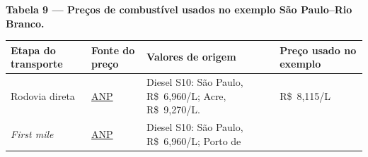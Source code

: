 \documentclass[brazil,]{article}
\newcommand{\keeptable}{\Needspace{0.64\textheight}}
\begin{document}
\keeptable
\textbf{Tabela 9 --- Preços de combustível usados no exemplo São
Paulo--Rio Branco.}

\begin{longtable}[]{@{}llll@{}}
\toprule
\begin{minipage}[b]{0.22\columnwidth}\raggedright
Etapa do transporte\strut
\end{minipage} & \begin{minipage}[b]{0.22\columnwidth}\raggedright
Fonte do preço\strut
\end{minipage} & \begin{minipage}[b]{0.22\columnwidth}\raggedright
Valores de origem\strut
\end{minipage} & \begin{minipage}[b]{0.22\columnwidth}\raggedright
Preço usado no exemplo\strut
\end{minipage}\tabularnewline
\midrule
\endhead
\begin{minipage}[t]{0.22\columnwidth}\raggedright
Rodovia direta\strut
\end{minipage} & \begin{minipage}[t]{0.22\columnwidth}\raggedright
\href{https://www.gov.br/anp/pt-br/assuntos/precos-e-defesa-da-concorrencia/precos/levantamento-de-precos-de-combustiveis-ultimas-semanas-pesquisadas}{ANP}\strut
\end{minipage} & \begin{minipage}[t]{0.22\columnwidth}\raggedright
Diesel S10: \newline{} São Paulo, R\$~6,960/L; \newline{} Acre,
R\$~9,270/L.\strut
\end{minipage} & \begin{minipage}[t]{0.22\columnwidth}\raggedright
R\$~8,115/L\strut
\end{minipage}\tabularnewline
\begin{minipage}[t]{0.22\columnwidth}\raggedright
\emph{First mile}\strut
\end{minipage} & \begin{minipage}[t]{0.22\columnwidth}\raggedright
\href{https://www.gov.br/anp/pt-br/assuntos/precos-e-defesa-da-concorrencia/precos/levantamento-de-precos-de-combustiveis-ultimas-semanas-pesquisadas}{ANP}\strut
\end{minipage} & \begin{minipage}[t]{0.22\columnwidth}\raggedright
Diesel S10: \newline{} São Paulo, R\$~6,960/L; \newline{} Porto de

\end{minipage}
\end{longtable}
\end{document}
